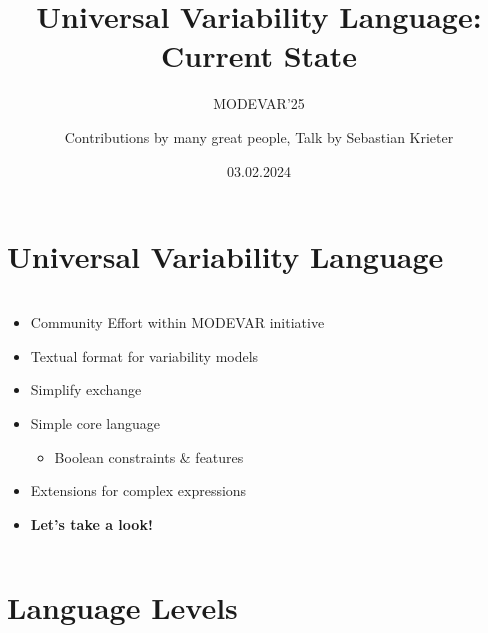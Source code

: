 \documentclass[
	aspectratio=169, %
	8pt, %
	nosectionframes, %
]{beamer}
\title[UVL: Current State]{Universal Variability Language: Current State} %
\subtitle[MODEVAR'25]{MODEVAR'25} %
\author[Sebastian Krieter]{Contributions by many great people, Talk by Sebastian Krieter} %
\date{03.02.2024} %
\begin{document}

\section{Universal Variability Language}

\begin{frame}
	\frametitle{\insertsection}
	\begin{columns}
		\begin{column}{0.49\textwidth}
			\begin{itemize}
				\item Community Effort within MODEVAR initiative
				\item Textual format for variability models
				\item Simplify exchange
				\item<2-> Simple core language
                \begin{itemize}
                    \item Boolean constraints \& features
                \end{itemize}
                \item<2-> Extensions for complex expressions
                \item<3-> \textbf{Let's take a look!}
			\end{itemize}
		\end{column}

		\begin{column}{0.49\textwidth}
		\end{column}
	\end{columns}
\end{frame}

\section{Language Levels}
\end{document}
